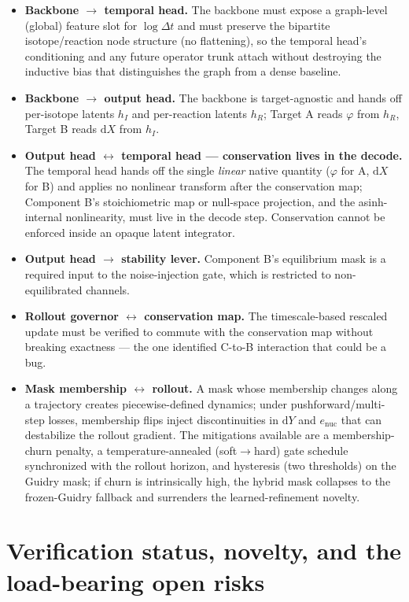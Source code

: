\documentclass[11pt]{article}
\newcommand{\enuc}{e_{\mathrm{nuc}}}
\newcommand{\dd}{\mathrm{d}}
\begin{document}
\begin{itemize}[leftmargin=*]
  \item \textbf{Backbone $\to$ temporal head.} The backbone must expose a graph-level (global) feature slot for $\log\Delta t$ and must preserve the bipartite isotope/reaction node structure (no flattening), so the temporal head's conditioning and any future operator trunk attach without destroying the inductive bias that distinguishes the graph from a dense baseline.
  \item \textbf{Backbone $\to$ output head.} The backbone is target-agnostic and hands off per-isotope latents $h_I$ and per-reaction latents $h_R$; Target A reads $\varphi$ from $h_R$, Target B reads $\dd X$ from $h_I$.
  \item \textbf{Output head $\leftrightarrow$ temporal head --- conservation lives in the decode.} The temporal head hands off the single \emph{linear} native quantity ($\varphi$ for A, $\dd X$ for B) and applies no nonlinear transform after the conservation map; Component B's stoichiometric map or null-space projection, and the asinh-internal nonlinearity, must live in the decode step. Conservation cannot be enforced inside an opaque latent integrator.
  \item \textbf{Output head $\to$ stability lever.} Component B's equilibrium mask is a required input to the noise-injection gate, which is restricted to non-equilibrated channels.
  \item \textbf{Rollout governor $\leftrightarrow$ conservation map.} The timescale-based rescaled update must be verified to commute with the conservation map without breaking exactness --- the one identified C-to-B interaction that could be a bug.
  \item \textbf{Mask membership $\leftrightarrow$ rollout.} A mask whose membership changes along a trajectory creates piecewise-defined dynamics; under pushforward/multi-step losses, membership flips inject discontinuities in $\dd Y$ and $\enuc$ that can destabilize the rollout gradient. The mitigations available are a membership-churn penalty, a temperature-annealed (soft$\to$hard) gate schedule synchronized with the rollout horizon, and hysteresis (two thresholds) on the Guidry mask; if churn is intrinsically high, the hybrid mask collapses to the frozen-Guidry fallback and surrenders the learned-refinement novelty.
\end{itemize}

\section{Verification status, novelty, and the load-bearing open risks}
\end{document}
